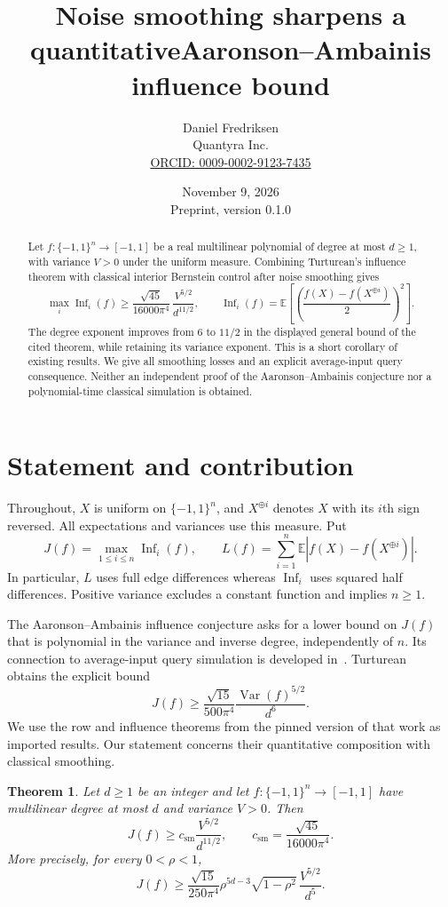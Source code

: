\documentclass[11pt]{article}
\title{Noise smoothing sharpens a quantitative\newline Aaronson--Ambainis influence bound}
\author{Daniel Fredriksen\\\small Quantyra Inc.\\\small\href{https://orcid.org/0009-0002-9123-7435}{ORCID: 0009-0002-9123-7435}}
\date{November 9, 2026\\\small Preprint, version 0.1.0}
\newtheorem{theorem}{Theorem}
\theoremstyle{remark}\newtheorem{remark}[theorem]{Remark}
\newcommand{\E}{\mathbb E}
\newcommand{\Var}{\operatorname{Var}}
\newcommand{\Inf}{\operatorname{Inf}}
\newcommand{\csm}{c_{\mathrm{sm}}}
\newcommand{\Q}{\{-1,1\}^n}
\begin{document}
\maketitle
\begin{abstract}
Let $f:\Q\to[-1,1]$ be a real multilinear polynomial of degree at most $d\ge1$, with variance $V>0$ under the uniform measure. Combining Turturean's influence theorem with classical interior Bernstein control after noise smoothing gives
\[
 \max_i\Inf_i(f)\ge \frac{\sqrt{45}}{16000\pi^4}\,
                    \frac{V^{5/2}}{d^{11/2}},
 \qquad \Inf_i(f)=\E\left[\left(\frac{f(X)-f(X^{\oplus i})}{2}\right)^2\right].
\]
The degree exponent improves from $6$ to $11/2$ in the displayed general bound of the cited theorem, while retaining its variance exponent. This is a short corollary of existing results. We give all smoothing losses and an explicit average-input query consequence. Neither an independent proof of the Aaronson--Ambainis conjecture nor a polynomial-time classical simulation is obtained.
\end{abstract}

\section{Statement and contribution}
Throughout, $X$ is uniform on $\Q$, and $X^{\oplus i}$ denotes $X$ with its $i$th sign reversed. All expectations and variances use this measure. Put
\[
 J(f)=\max_{1\le i\le n}\Inf_i(f),\qquad
 L(f)=\sum_{i=1}^n\E|f(X)-f(X^{\oplus i})|.
\]
In particular, $L$ uses full edge differences whereas $\Inf_i$ uses squared half differences. Positive variance excludes a constant function and implies $n\ge1$.

The Aaronson--Ambainis influence conjecture asks for a lower bound on $J(f)$ that is polynomial in the variance and inverse degree, independently of $n$. Its connection to average-input query simulation is developed in~\cite{AA}. Turturean~\cite{T} obtains the explicit bound
\begin{equation}\label{eq:old}
 J(f)\ge \frac{\sqrt{15}}{500\pi^4}\frac{\Var(f)^{5/2}}{d^6}.
\end{equation}
We use the row and influence theorems from the pinned version of that work as imported results. Our statement concerns their quantitative composition with classical smoothing.

\begin{theorem}\label{thm:main}
Let $d\ge1$ be an integer and let $f:\Q\to[-1,1]$ have multilinear degree at most $d$ and variance $V>0$. Then
\begin{equation}\label{eq:main}
 J(f)\ge\csm\frac{V^{5/2}}{d^{11/2}},\qquad
 \csm=\frac{\sqrt{45}}{16000\pi^4}.
\end{equation}
More precisely, for every $0<\rho<1$,
\begin{equation}\label{eq:rho}
 J(f)\ge\frac{\sqrt{15}}{250\pi^4}
     \rho^{5d-3}\sqrt{1-\rho^2}\,\frac{V^{5/2}}{d^5}.
\end{equation}
\end{theorem}
\end{document}
